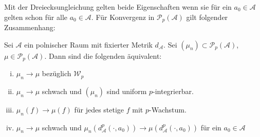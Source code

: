 Mit der Dreiecksungleichung gelten beide Eigenschaften wenn sie für ein $a_0 \in \mathcal{A}$ gelten schon für alle $a_0 \in \mathcal{A}$.
Für Konvergenz in $\mathcal{P}_p(\mathcal{A})$ gilt folgender Zusammenhang:
\begin{lemma}\label{thm:conv_char}
Sei $\mathcal{A}$ ein polnischer Raum mit fixierter Metrik $d_\mathcal{A}$. Sei $(\mu_n) \subset \mathcal{P}_p(\mathcal{A})$, $\mu \in \mathcal{P}_p(\mathcal{A})$. Dann sind die folgenden äquivalent:
\begin{enumerate}[(i)]
    \item $\mu_n \rightarrow \mu$ bezüglich $\mathcal{W}_p$
    \item $\mu_n \rightarrow \mu$ schwach und $(\mu_n)$ sind uniform $p$-integrierbar.
    \item $\mu_n(f) \rightarrow \mu(f)$ für jedes stetige $f$ mit $p$-Wachstum.
    \item $\mu_n \rightarrow \mu$ schwach und $\mu_n(d_\mathcal{A}^p(\cdot, a_0)) \rightarrow \mu(d_\mathcal{A}^p(\cdot, a_0))$ für ein $a_0 \in \mathcal{A}$
\end{enumerate}
\end{lemma}
